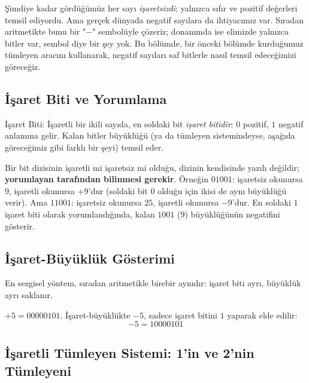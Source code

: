 Şimdiye kadar gördüğümüz her sayı \emph{işaretsizdi}; yalnızca sıfır ve pozitif değerleri
temsil ediyordu. Ama gerçek dünyada negatif sayılara da ihtiyacımız var. Sıradan
aritmetikte bunu bir "$-$" sembolüyle çözeriz; donanımda ise elimizde yalnızca bitler var,
sembol diye bir şey yok. Bu bölümde, bir önceki bölümde kurduğumuz tümleyen aracını
kullanarak, negatif sayıları saf bitlerle nasıl temsil edeceğimizi göreceğiz.

\subsection{İşaret Biti ve Yorumlama}
\label{sec:isaret-biti}

\begin{tanim}{İşaret Biti:}
İşaretli bir ikili sayıda, en soldaki bit \emph{işaret bitidir}: $0$ pozitif, $1$ negatif
anlamına gelir. Kalan bitler büyüklüğü (ya da tümleyen sistemindeyse, aşağıda göreceğimiz
gibi farklı bir şeyi) temsil eder.
\end{tanim}

\begin{bilginot}
Bir bit dizisinin işaretli mi işaretsiz mi olduğu, dizinin kendisinde yazılı değildir;
\textbf{yorumlayan tarafından bilinmesi gerekir}. Örneğin $01001$: işaretsiz okunursa $9$,
işaretli okunursa $+9$'dur (soldaki bit $0$ olduğu için ikisi de aynı büyüklüğü verir). Ama
$11001$: işaretsiz okunursa $25$, işaretli okunursa $-9$'dur. En soldaki $1$ işaret biti
olarak yorumlandığında, kalan $1001$ ($9$) büyüklüğünün negatifini gösterir.
\end{bilginot}

\subsection{İşaret-Büyüklük Gösterimi}
\label{sec:isaret-buyukluk}

En sezgisel yöntem, sıradan aritmetikle birebir aynıdır: işaret biti ayrı, büyüklük ayrı
saklanır.

\begin{ornek}
$+5=00000101$. İşaret-büyüklükte $-5$, sadece işaret bitini $1$ yaparak elde edilir:
\[
-5 = 10000101
\]
\end{ornek}

\subsection{İşaretli Tümleyen Sistemi: 1'in ve 2'nin Tümleyeni}
\label{sec:isaretli-tumleyen}

